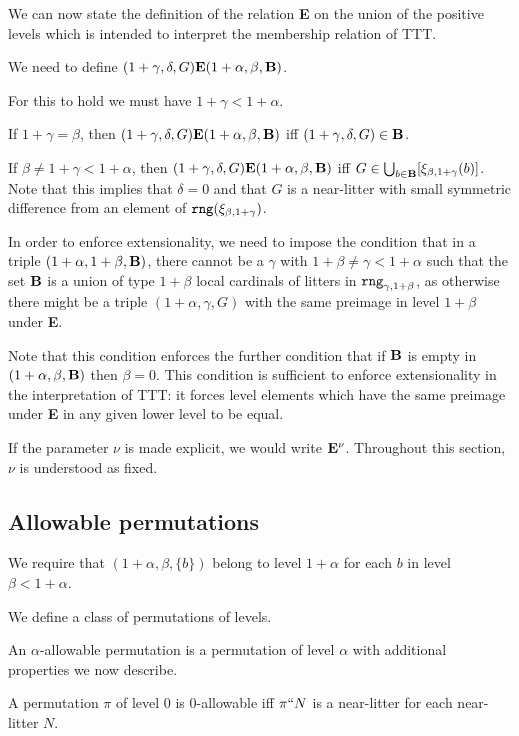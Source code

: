 \documentclass[12pt]{article}
\begin{document}
We can now state the definition of the relation {\bf E} on the union of the positive levels which is intended to interpret the membership relation of TTT.  

We need to define
$(1+\gamma,\delta,G) {\bf E} (1+\alpha,\beta,{\bf B})$.  

For this to hold we must have $1+\gamma<1+\alpha$.  

If $1+\gamma=\beta$, then $(1+\gamma,\delta,G) {\bf E} (1+\alpha,\beta,{\bf B})$ iff $(1+\gamma,\delta,G) \in {\bf B}$.  

If $\beta \neq 1+\gamma <1+\alpha$, then $(1+\gamma,\delta,G) {\bf E} (1+\alpha,\beta,{\bf B})$ iff $G \in \bigcup_{b \in {\bf B}}[\xi_{\beta,1+\gamma}(b)]$.  Note that this implies
that $\delta=0$ and that $G$ is a near-litter with small symmetric difference from an element of ${\tt rng}(\xi_{\beta,1+\gamma})$.

In order to enforce extensionality, we need to impose the condition that in a triple $(1+\alpha,1+\beta,{\bf B})$, there cannot be a $\gamma$ with $1+\beta\neq \gamma<1+\alpha$ such that the set ${\bf B}$ is a union of type $1+\beta$ local cardinals of litters
in ${\tt rng}_{\gamma,1+\beta}$, as otherwise there might be a triple $(1+\alpha,\gamma,G)$ with the same preimage in level $1+\beta$ under {\bf E}.


Note that this condition enforces the further condition that if ${\bf B}$ is empty in $(1+\alpha,\beta,{\bf B})$ then $\beta=0$.  This condition is sufficient to enforce extensionality in the interpretation of TTT:  it forces level elements which have the same preimage under {\bf E} in any given lower level to be equal.

If the parameter $\nu$ is made explicit, we would write ${\bf E}^\nu$.  Throughout this section, $\nu$ is understood as fixed.

\subsection{Allowable permutations}

We require that $(1+\alpha,\beta,\{b\})$ belong to level $1+\alpha$ for
each $b$ in level $\beta<1+\alpha$.

We define a class of permutations of levels.

An $\alpha$-allowable permutation is a permutation of level $\alpha$ with additional properties we now describe.

A permutation $\pi$ of level 0 is 0-allowable iff $\pi``N$ is a near-litter for each near-litter $N$.
\end{document}
